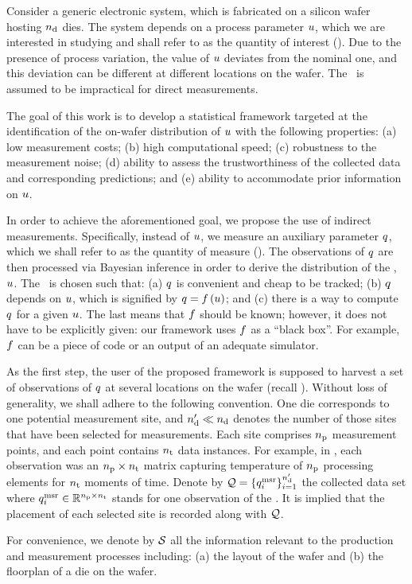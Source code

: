 Consider a generic electronic system, which is fabricated on a silicon wafer hosting ${n_\text{d}}$ dies.
The system depends on a process parameter $u$, which we are interested in studying and shall refer to as the quantity of interest (\qoi).
Due to the presence of process variation, the value of $u$ deviates from the nominal one, and this deviation can be different at different locations on the wafer.
The \qoi\ is assumed to be impractical for direct measurements.

The goal of this work is to develop a statistical framework targeted at the identification of the on-wafer distribution of $u$ with the following properties: (a) low measurement costs; (b) high computational speed; (c) robustness to the measurement noise; (d) ability to assess the trustworthiness of the collected data and corresponding predictions; and (e) ability to accommodate prior information on $u$.

In order to achieve the aforementioned goal, we propose the use of indirect measurements.
Specifically, instead of $u$, we measure an auxiliary parameter $q$, which we shall refer to as the quantity of measure (\qom).
The observations of $q$ are then processed via Bayesian inference in order to derive the distribution of the \qoi, $u$.
The \qom\ is chosen such that: (a) $q$ is convenient and cheap to be tracked; (b) $q$ depends on $u$, which is signified by $\q = \oBB{\u}$; and (c) there is a way to compute $q$ for a given $u$.
The last means that $\oBB$ should be known; however, it does not have to be explicitly given: our framework uses $\oBB$ as a ``black box''.
For example, $\oBB$ can be a piece of code or an output of an adequate simulator.

As the first step, the user of the proposed framework is supposed to harvest a set of observations of $q$ at several locations on the wafer (recall ).
Without loss of generality, we shall adhere to the following convention.
One die corresponds to one potential measurement site, and ${n_\text{d}'} \ll {n_\text{d}}$ denotes the number of those sites that have been selected for measurements.
Each site comprises ${n_\text{p}}$ measurement points, and each point contains ${n_\text{t}}$ data instances.
For example, in , each observation was an ${n_\text{p}} \times {n_\text{t}}$ matrix capturing temperature of ${n_\text{p}}$ processing elements for ${n_\text{t}}$ moments of time.
Denote by $\mathcal{Q} = \{ q_i^{\text{msr}} \}_{i = 1}^{n_\text{d}'}$ the collected data set where $q_i^{\text{msr}} \in \mathbb{R}^{{n_\text{p}} \times {n_\text{t}}}$ stands for one observation of the \qom.
It is implied that the placement of each selected site is recorded along with $\mathcal{Q}$.

For convenience, we denote by $\mathcal{S}$ all the information relevant to the production and measurement processes including: (a) the layout of the wafer and (b) the floorplan of a die on the wafer.
